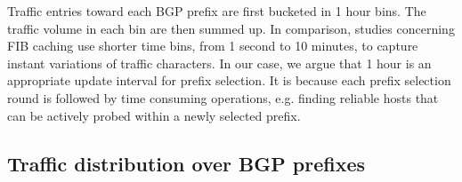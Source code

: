 Traffic entries toward each BGP prefix are first bucketed in 1 hour bins. 
The traffic volume in each bin are then summed up.
In comparison, studies concerning FIB caching \cite{Sarrar2012, Zhang2012} use shorter time bins, from 1 second to 10 minutes, to capture instant variations of traffic characters.
In our case, we argue that 1 hour is an appropriate update interval for 
prefix selection.
It is because each prefix selection round is followed by time consuming operations, e.g. finding reliable hosts that can be actively probed within a newly selected prefix. 

\subsection{Traffic distribution over BGP prefixes}
\label{sec:dis}

